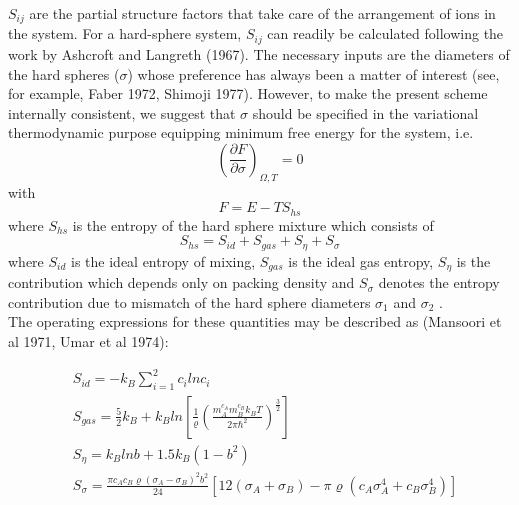 \documentclass[12pt]{article}
\newcommand*{\1}{\hspace{1pt}}
\begin{document}
    $S_{ij}$ are the partial structure factors that take care of the arrangement of ions in the
system. For a hard-sphere system,  $S_{ij}$ can readily be calculated following the work by
Ashcroft and Langreth (1967). The necessary inputs are the diameters of the hard spheres ($\sigma $)
whose preference has always been a matter of interest (see, for example, Faber 1972, Shimoji
1977). However, to make the present scheme internally consistent, we suggest that $\sigma$ should be 
specified in the variational thermodynamic purpose equipping minimum free
energy for the system, i.e.
    \begin{equation}
       \left(\frac{\partial F}{\partial \sigma }\right) _{\Omega ,T} = 0
    \end{equation}
with\\
    \begin{equation}
        F = E - TS_{hs}
    \end{equation}
where $S_{hs}$ is the entropy of the hard sphere mixture which consists of \\
    \begin{equation}
        S_{hs} = S_{id} + S_{gas} + S_{\eta} + S_{\sigma}
    \end{equation}
where $S_{id}$ is the ideal entropy of mixing, $S_{gas}$ is the ideal gas entropy, $S_{\eta}$ 
is the contribution
which depends only on packing density and $S_{\sigma}$ denotes the entropy contribution due to
mismatch of the hard sphere diameters $\sigma_1$ and $\sigma_2$ .\\
    The operating expressions for these quantities may be described as (Mansoori et al 1971,
Umar et al 1974): 
   

\begin{align}
    &  S_{id} = -k_B \sum_{i = 1}^{2} c_{i} lnc_{i} \\
    &  S_{gas} = \frac{5}{2}k_{B} + k_{B}ln\left[\frac{1}{\varrho}\left(\frac{m^{c_{A}}_{A}m^{c_{B}}_{B}k_{B}T}{{2\pi \hbar ^{2}}}\right)^{\frac{3}{2}} \right] \\
    &  S_{\eta} = k_B lnb + 1.5k_{B}(1 - b^2)\\
    & S_{\sigma} = \frac{\pi c_{A}c_{B}\varrho(\sigma_{A} - \sigma_{B})^{2}b^{2}}{24}[12(\sigma_{A} + \sigma_{B}) -
     \pi \varrho (c_{A}\sigma^{4}_{A} + c_{B}\sigma^{4}_{B})]     
    \end{align}\\
\end{document}
